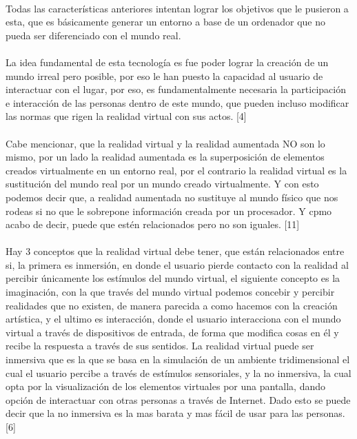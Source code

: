 \documentclass{bmcart}
\begin{document}
\paragraph{}
Todas las características anteriores intentan lograr los objetivos que le pusieron a esta, que es básicamente generar un entorno a base de un ordenador que no pueda ser diferenciado con el mundo real.
\paragraph{}
La idea fundamental de esta tecnología es  fue poder lograr la creación de un mundo irreal pero posible, por eso le han puesto la capacidad al usuario de interactuar con el lugar, por eso, es fundamentalmente necesaria la participación e interacción de las personas dentro de este mundo, que pueden incluso modificar las normas que rigen la realidad virtual con sus actos. [4]
\paragraph{}
Cabe mencionar, que la realidad virtual y la realidad aumentada NO son lo mismo, por un lado la realidad aumentada es la superposición de elementos creados virtualmente en un entorno real, por el contrario la realidad virtual es la sustitución del mundo real por un mundo creado virtualmente. Y con esto podemos decir que, a realidad aumentada no sustituye al mundo físico que nos rodeas si no que le sobrepone información creada por un procesador. Y cpmo acabo de decir, puede que estén relacionados pero no son iguales. [11]
\paragraph{}
Hay 3 conceptos que la realidad virtual debe tener, que están relacionados entre si, la primera es inmersión, en donde el usuario pierde contacto con la realidad al percibir únicamente los estímulos del mundo virtual, el siguiente concepto es la imaginación, con la que través del mundo virtual podemos concebir y percibir realidades que no existen, de manera parecida a como hacemos con la creación artística, y el ultimo es interacción, donde el usuario interacciona con el mundo virtual a través de dispositivos de entrada, de forma que modifica cosas en él y recibe la respuesta a través de sus sentidos. La realidad virtual puede ser inmersiva que es la que se basa en la simulación de un ambiente tridimensional el cual el usuario percibe a través de estímulos sensoriales, y la no inmersiva, la cual opta por la visualización de los elementos virtuales por una pantalla, dando opción de interactuar con otras personas a través de Internet. Dado esto se puede decir que la no inmersiva es la mas barata y mas fácil de usar para las personas. [6]
\end{document}
